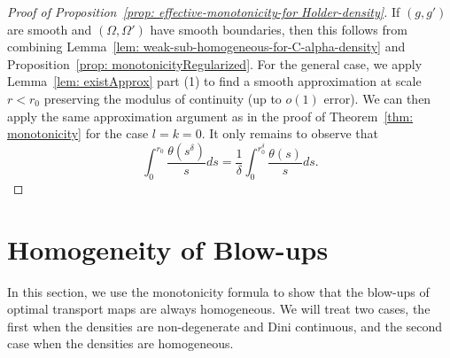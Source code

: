 \documentclass[12pt,reqno]{amsart}
\numberwithin{equation}{section}
\begin{document}
\begin{proof}[Proof of Proposition~\ref{prop: effective-monotonicity-for Holder-density}]
    If $(g, g')$ are smooth and $(\Omega, \Omega')$ have smooth boundaries, then this follows from combining Lemma~\ref{lem: weak-sub-homogeneous-for-C-alpha-density} and Proposition~\ref{prop: monotonicityRegularized}. For the general case, we apply Lemma~\ref{lem: existApprox} part (1) to find a smooth approximation at scale $r<r_0$ preserving the modulus of continuity (up to $o(1)$ error). We can then apply the same approximation argument as in the proof of Theorem~\ref{thm: monotonicity} for the case $l=k=0$. It only remains to observe that
    \[
    \int_0^{r_0} \frac{\theta(s^{\delta})}{s}ds = \frac{1}{\delta}\int_0^{r_0^{\delta}} \frac{\theta(s)}{s}ds.
    \]
\end{proof}

\section{Homogeneity of Blow-ups}\label{Sec: homogeneity-of-blow-ups}
    In this section, we use the monotonicity formula to show that the blow-ups of optimal transport maps are always homogeneous. We will treat two cases, the first when the densities are non-degenerate and Dini continuous, and the second case when the densities are homogeneous. 
    
\end{document}
